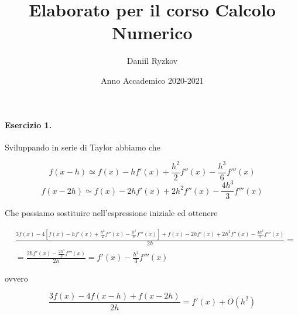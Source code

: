 \documentclass[12pt, a4paper]{article}
\title{Elaborato per il corso Calcolo Numerico}
\author{Daniil Ryzkov}
\date{Anno Accademico 2020-2021}
\begin{document}
\maketitle
\newpage

\paragraph{Esercizio 1.} Sviluppando in serie di Taylor abbiamo che

\[ f(x-h) \simeq f(x) - hf'(x) + \frac{h^2}{2}f''(x) - \frac{h^3}{6}f'''(x) \]
\[ f(x-2h) \simeq f(x) - 2hf'(x) + 2h^2f''(x) - \frac{4h^3}{3}f'''(x) \]

Che possiamo sostituire nell'espressione iniziale ed ottenere

\[
\begin{split}
& \frac{3f(x) - 4\left[f(x) - hf'(x) + \frac{h^2}{2}f''(x) - \frac{h^3}{6}f'''(x)\right] + f(x) - 2hf'(x) + 2h^2f''(x) - \frac{4h^3}{3}f'''(x)}{2h} =  \\
& = \frac{2hf'(x) - \frac{2h^3}{3}f'''(x)}{2h} = f'(x) - \frac{h^2}{3}f'''(x)
\end{split}
\]

ovvero

\[ \frac{3f(x) - 4f(x-h) + f(x-2h)}{2h} = f'(x) + O(h^2) \]
\end{document}
